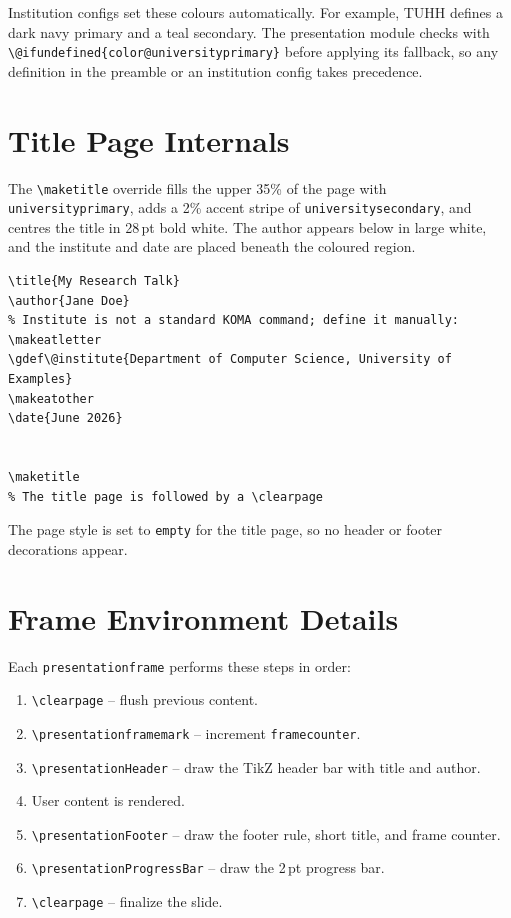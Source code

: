 Institution configs set these colours automatically.  For example, TUHH
defines a dark navy primary and a teal secondary.  The presentation module
checks with \texttt{\textbackslash @ifundefined\{color@universityprimary\}}
before applying its fallback, so any definition in the preamble or an
institution config takes precedence.

\section{Title Page Internals}

The \texttt{\textbackslash maketitle} override fills the upper 35\% of the
page with \texttt{universityprimary}, adds a 2\% accent stripe of
\texttt{universitysecondary}, and centres the title in 28\,pt bold white.
The author appears below in large white, and the institute and date are
placed beneath the coloured region.

\begin{verbatim}
\title{My Research Talk}
\author{Jane Doe}
% Institute is not a standard KOMA command; define it manually:
\makeatletter
\gdef\@institute{Department of Computer Science, University of Examples}
\makeatother
\date{June 2026}


\maketitle
% The title page is followed by a \clearpage

\end{verbatim}

The page style is set to \texttt{empty} for the title page, so no header or
footer decorations appear.

\section{Frame Environment Details}

Each \texttt{presentationframe} performs these steps in order:

\begin{enumerate}
    \item \texttt{\textbackslash clearpage} -- flush previous content.
    \item \texttt{\textbackslash presentationframemark} -- increment
          \texttt{framecounter}.
    \item \texttt{\textbackslash presentationHeader} -- draw the TikZ header
          bar with title and author.
    \item User content is rendered.
    \item \texttt{\textbackslash presentationFooter} -- draw the footer rule,
          short title, and frame counter.
    \item \texttt{\textbackslash presentationProgressBar} -- draw the 2\,pt
          progress bar.
    \item \texttt{\textbackslash clearpage} -- finalize the slide.
\end{enumerate}

